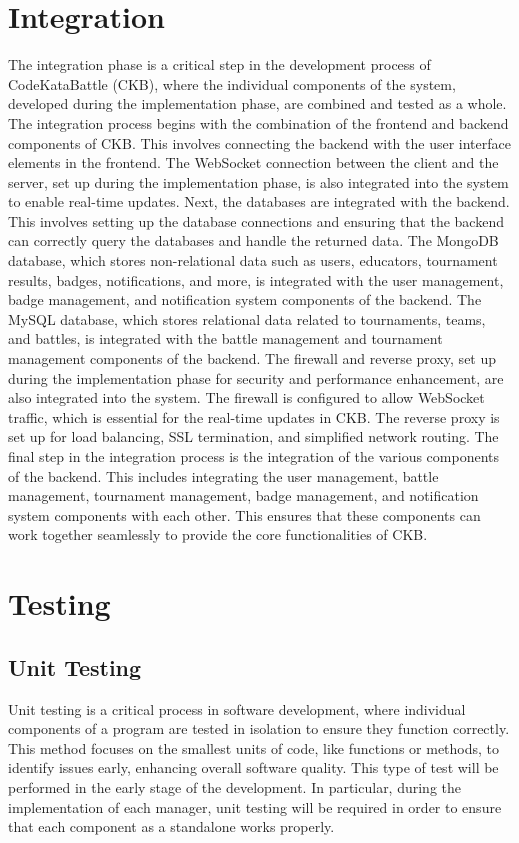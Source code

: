 \section{Integration}
The integration phase is a critical step in the development process of CodeKataBattle (CKB), where the individual components of the system, 
developed during the implementation phase, are combined and tested as a whole.\newline
The integration process begins with the combination of the frontend and backend components of CKB. 
This involves connecting the backend with the user interface elements in the frontend. 
The WebSocket connection between the client and the server, set up during the implementation phase, is also integrated into the system to enable real-time updates.\newline
Next, the databases are integrated with the backend. 
This involves setting up the database connections and ensuring that the backend can correctly query the databases and handle the returned data. 
The MongoDB database, which stores non-relational data such as users, educators, tournament results, badges, notifications, and more, 
is integrated with the user management, badge management, and notification system components of the backend. 
The MySQL database, which stores relational data related to tournaments, teams, and battles, is integrated with the battle management 
and tournament management components of the backend.\newline
The firewall and reverse proxy, set up during the implementation phase for security and performance enhancement, 
are also integrated into the system. The firewall is configured to allow WebSocket traffic, 
which is essential for the real-time updates in CKB. The reverse proxy is set up for load balancing, SSL termination, and simplified network routing.\newline
The final step in the integration process is the integration of the various components of the backend. 
This includes integrating the user management, battle management, tournament management, badge management, 
and notification system components with each other. This ensures that these components can work together seamlessly to provide the core functionalities of CKB.

\section{Testing}
\subsection{Unit Testing}
Unit testing is a critical process in software development, where individual components of a program are tested in isolation to ensure they function correctly. 
This method focuses on the smallest units of code, like functions or methods, to identify issues early, enhancing overall software quality. 
This type of test will be performed in the early stage of the development. In particular, 
during the implementation of each manager, unit testing will be required in order to ensure that each component as a standalone works properly.


